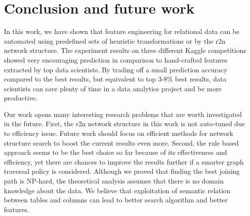 \section{Conclusion and future work}
In this work, we have shown that feature engineering for relational data  can be automated using predefined sets of heuristic transformations or by the r2n network structure. The experiment results on three different Kaggle competitions showed very encouraging prediction in comparison to hand-crafted features extracted by top data scientists. By trading off a small prediction accuracy compared to the best results, but equivalent  to top 3-8\% best results, data scientists can save plenty of time in a data analytics project and be more productive.    

Our work opens many interesting research problems that are worth investigated in the future. First, the r2n network structure in this work is not auto-tuned due to efficiency issue. Future work should focus on efficient methods for network structure search to  boost the current results even more. Second, the rule based approach seems to be the best choice so far because of its effectiveness and efficiency, yet there are chances to improve the results further if a smarter graph traversal policy is considered. Although we proved that finding the best joining path is NP-hard, the theoretical analysis assumes that there is no domain knowledge about the data. We believe that exploitation of semantic relation between tables and columns can lead to better search algorithm and better features.  

